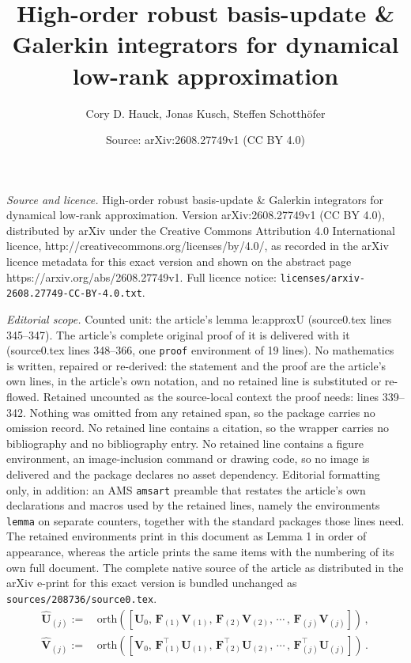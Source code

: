 \documentclass[10pt,a4paper]{amsart}
\title{High-order robust basis-update \& Galerkin integrators for dynamical low-rank approximation}
\author{Cory D. Hauck, Jonas Kusch, Steffen Schotth\"ofer}
\date{Source: arXiv:2608.27749v1 (CC BY 4.0)}
\newcommand\bfF{{\mathbf F}}
\newcommand\bfU{{\mathbf U}}
\newcommand\bfV{{\mathbf V}}
\begin{document}
\maketitle

\noindent\emph{Source and licence.} High-order robust basis-update \& Galerkin integrators for dynamical low-rank approximation. Version arXiv:2608.27749v1 (CC BY 4.0), distributed by arXiv under the Creative Commons Attribution 4.0 International licence, http://creativecommons.org/licenses/by/4.0/, as recorded in the arXiv licence metadata for this exact version and shown on the abstract page https://arxiv.org/abs/2608.27749v1. Full licence notice: \texttt{licenses/arxiv-2608.27749-CC-BY-4.0.txt}.\par\smallskip

\noindent\textit{Editorial scope.} Counted unit: the article's lemma le:approxU (source0.tex lines 345--347). The article's complete original proof of it is delivered with it (source0.tex lines 348--366, one \texttt{proof} environment of 19 lines). No mathematics is written, repaired or re-derived: the statement and the proof are the article's own lines, in the article's own notation, and no retained line is substituted or re-flowed.  Retained uncounted as the source-local context the proof needs: lines 339--342.  Nothing was omitted from any retained span, so the package carries no omission record.  No retained line contains a citation, so the wrapper carries no bibliography and no bibliography entry.  No retained line contains a figure environment, an image-inclusion command or drawing code, so no image is delivered and the package declares no asset dependency.  Editorial formatting only, in addition: an AMS \texttt{amsart} preamble that restates the article's own declarations and macros used by the retained lines, namely the environments \texttt{lemma} on separate counters, together with the standard packages those lines need.  The retained environments print in this document as Lemma 1 in order of appearance, whereas the article prints the same items with the numbering of its own full document.  The complete native source of the article as distributed in the arXiv e-print for this exact version is bundled unchanged as \texttt{sources/208736/source0.tex}.
\begin{align}
    \widehat\bfU_{(j)} :=\,& \text{orth}([\bfU_0, \,\bfF_{(1)}\bfV_{(1)}, \,\bfF_{(2)}\bfV_{(2)}, \,\cdots \,, \,\bfF_{(j)}\bfV_{(j)}])\,,\label{eq:augBasisGeneralU} \\ 
    \widehat\bfV_{(j)} :=\,& \text{orth}([\bfV_0, \,\bfF_{(1)}^{\top}\bfU_{(1)}, \,\bfF_{(2)}^{\top}\bfU_{(2)}, \,\cdots\,, \,\bfF_{(j)}^{\top}\bfU_{(j)}])\,. \label{eq:augBasisGeneralV}
\end{align}
\end{document}
